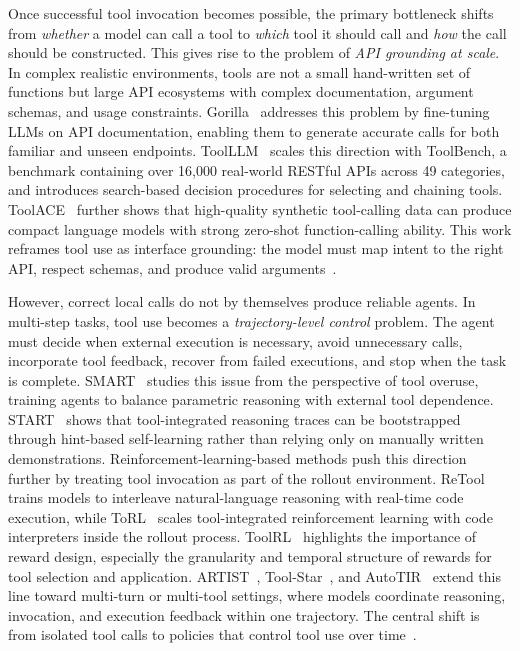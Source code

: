 Once successful tool invocation becomes possible, the primary bottleneck shifts from \emph{whether} a model can call a tool to \emph{which} tool it should call and \emph{how} the call should be constructed. This gives rise to the problem of \emph{API grounding at scale}. In complex realistic environments, tools are not a small hand-written set of functions but large API ecosystems with complex documentation, argument schemas, and usage constraints. Gorilla~\cite{patil2023gorilla} addresses this problem by fine-tuning LLMs on API documentation, enabling them to generate accurate calls for both familiar and unseen endpoints. ToolLLM~\cite{qin2023toolllm} scales this direction with ToolBench, a benchmark containing over 16,000 real-world RESTful APIs across 49 categories, and introduces search-based decision procedures for selecting and chaining tools. ToolACE~\cite{liu2025toolace} further shows that high-quality synthetic tool-calling data can produce compact language models with strong zero-shot function-calling ability. This work reframes tool use as interface grounding: the model must map intent to the right API, respect schemas, and produce valid arguments~\citep{pan2024webcanvas,trabucco2025towards,hu2025agentgen,wang2023describe,cheng2024exploring,zhuang2023toolqa,huang2024metatool,guo2024stabletoolbench,du2024anytool,song2023restgpt,miao2025recode}.

However, correct local calls do not by themselves produce reliable agents. In multi-step tasks, tool use becomes a \emph{trajectory-level control} problem. The agent must decide when external execution is necessary, avoid unnecessary calls, incorporate tool feedback, recover from failed executions, and stop when the task is complete. SMART~\cite{qian2025smart} studies this issue from the perspective of tool overuse, training agents to balance parametric reasoning with external tool dependence. START~\cite{li2025start} shows that tool-integrated reasoning traces can be bootstrapped through hint-based self-learning rather than relying only on manually written demonstrations. Reinforcement-learning-based methods push this direction further by treating tool invocation as part of the rollout environment. ReTool~\cite{feng2025retool} trains models to interleave natural-language reasoning with real-time code execution, while ToRL~\cite{li2025torl} scales tool-integrated reinforcement learning with code interpreters inside the rollout process. ToolRL~\cite{qian2026toolrl} highlights the importance of reward design, especially the granularity and temporal structure of rewards for tool selection and application. ARTIST~\cite{singh2505agentic}, Tool-Star~\cite{dong2505tool}, and AutoTIR~\cite{wei2025autotir} extend this line toward multi-turn or multi-tool settings, where models coordinate reasoning, invocation, and execution feedback within one trajectory. The central shift is from isolated tool calls to policies that control tool use over time~\citep{xi2025agentgym,mahdavi2024leveraging,li2025exploring,gao2024large,birr2024autogpt+,basu2024api,ye2025tooleyes,gao2024confucius,wang2024gta}.

